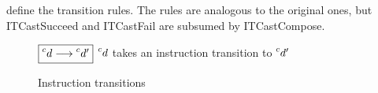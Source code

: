\documentclass[index.tex]{subfiles}
\begin{document}
 define the transition
rules. The rules are analogous to the original \HazelnutLive{} ones, but ITCastSucceed and
ITCastFail are subsumed by ITCastCompose.

\begin{figure}[htb!]
  $\judgbox{\transition{\IEMV}{\IEMV'}}$ $\IEMV$ takes an instruction transition to $\IEMV'$

  \begin{mathpar}



  \end{mathpar}
  \caption{Instruction transitions}
  \label{fig:coercion-instruction-transitions}
\end{figure}
\end{document}
